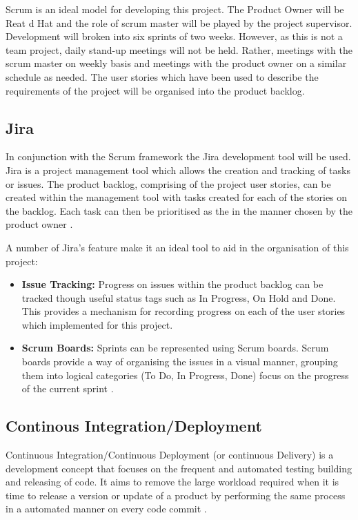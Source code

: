 	Scrum is an ideal model for developing this project. The Product Owner will be Reat
  d Hat and the role of scrum master will be played by the project supervisor. Development will broken into six sprints of two weeks. However, as this is not a team project, daily stand-up meetings will not be held. Rather, meetings with the scrum master on weekly basis and meetings with the product owner on a similar schedule as needed. The user stories which have been used to describe the requirements of the project will be organised into the product backlog.
	
	\subsection{Jira}
	In conjunction with the Scrum framework the Jira development tool will be used. Jira is a project management tool which allows the creation and tracking of tasks or issues. The product backlog, comprising of the project user stories, can be created within the management tool with tasks created for each of the stories on the backlog. Each task can then be prioritised as the in the manner chosen by the product owner \citep{jira}.
	
	A number of Jira's feature make it an ideal tool to aid in the organisation of this project:
	\begin{itemize}
		\item \textbf{Issue Tracking:} Progress on issues within the product backlog can be tracked though useful status tags such as In Progress, On Hold and Done. This provides a mechanism for recording progress on each of the user stories which implemented for this project. 
		\item \textbf{Scrum Boards: } Sprints can be represented using Scrum boards. Scrum boards provide a way of organising the issues in a visual manner, grouping them into logical categories (To Do, In Progress, Done) focus on the progress of the current sprint \cite{scruminc}.
	\end{itemize}

	\subsection{Continous Integration/Deployment}
	Continuous Integration/Continuous Deployment (or continuous Delivery) is a development concept that focuses on the frequent and automated testing building and releasing of code. It aims to remove the large workload required when it is time to release a version or update of a product by performing the same process in a automated manner on every code commit \citep{pittet}.
	
